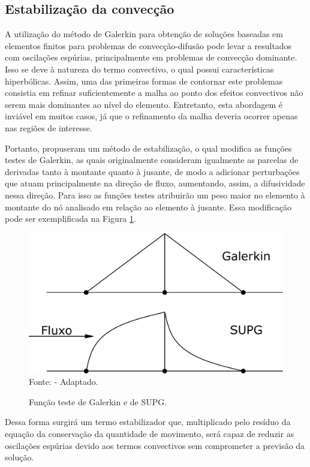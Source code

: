 \subsection{Estabilização da convecção}

A utilização do método de Galerkin para obtenção de soluções baseadas em elementos finitos para problemas de convecção-difusão pode levar a resultados com oscilações espúrias, principalmente em problemas de convecção dominante. Isso se deve à natureza do termo convectivo, o qual possui características hiperbólicas. Assim, uma das primeiras formas de contornar este problemas consistia em refinar suficientemente a malha ao ponto dos efeitos convectivos não serem mais dominantes ao nível do elemento. Entretanto, esta abordagem é inviável em muitos casos, já que o refinamento da malha deveria ocorrer apenas nas regiões de interesse.

Portanto,  propuseram um método de estabilização, o qual modifica as funções testes de Galerkin, as quais originalmente consideram igualmente as parcelas de derivadas tanto à montante quanto à jusante, de modo a adicionar perturbações que atuam principalmente na direção de fluxo, aumentando, assim, a difusividade nessa direção. Para isso as funções testes atribuirão um peso maior no elemento à montante do nó analisado em relação ao elemento à jusante. Essa modificação pode ser exemplificada na Figura \ref{fig:Supg}.

\begin{figure}[h!]
    \centering
    \caption{Função teste de Galerkin e de SUPG.}
    \includegraphics[width=.6\linewidth]{Figuras/SUPG.pdf}
    \\Fonte:  - Adaptado.
    \label{fig:Supg}
\end{figure}

Dessa forma surgirá um termo estabilizador que, multiplicado pelo resíduo da equação da conservação da quantidade de movimento, será capaz de reduzir as oscilações espúrias devido aos termos convectivos sem comprometer a previsão da solução.

